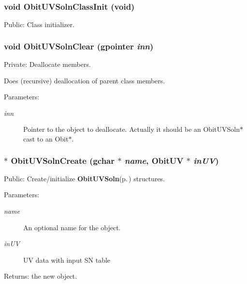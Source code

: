 \subsubsection{\setlength{\rightskip}{0pt plus 5cm}void Obit\-UVSoln\-Class\-Init (void)}\label{ObitUVSoln_8c_a35}


Public: Class initializer. 

\subsubsection{\setlength{\rightskip}{0pt plus 5cm}void Obit\-UVSoln\-Clear (gpointer {\em inn})}\label{ObitUVSoln_8c_a4}


Private: Deallocate members. 

Does (recursive) deallocation of parent class members. \begin{Desc}
\item[Parameters:]
\begin{description}
\item[{\em inn}]Pointer to the object to deallocate. Actually it should be an Obit\-UVSoln$\ast$ cast to an Obit$\ast$. \end{description}
\end{Desc}
\subsubsection{$\ast$ Obit\-UVSoln\-Create (gchar $\ast$ {\em name}, {\bf Obit\-UV} $\ast$ {\em in\-UV})}\label{ObitUVSoln_8c_a22}


Public: Create/initialize {\bf Obit\-UVSoln}{\rm (p.\,\pageref{structObitUVSoln})} structures. 

\begin{Desc}
\item[Parameters:]
\begin{description}
\item[{\em name}]An optional name for the object. \item[{\em in\-UV}]UV data with input SN table \end{description}
\end{Desc}
\begin{Desc}
\item[Returns:]the new object. \end{Desc}
